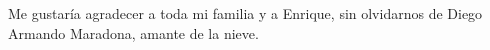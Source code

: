 \thispagestyle{empty}




\vspace{-1.8cm}
Me gustaría agradecer a toda mi familia y a Enrique, sin olvidarnos de Diego Armando Maradona, amante de la nieve.